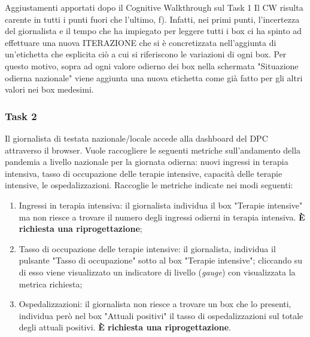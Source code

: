\begin{bclogo}{Aggiustamenti apportati dopo il Cognitive Walkthrough sul Task 1}
    Il CW risulta carente in tutti i punti fuori che l'ultimo, f).
    Infatti, nei primi punti, l'incertezza del giornalista e il tempo che ha impiegato per leggere tutti i box ci ha spinto ad effettuare una nuova ITERAZIONE che si è concretizzata nell'aggiunta di un'etichetta che esplicita ciò a cui si riferiscono le variazioni di ogni box.
    Per questo motivo, sopra ad ogni valore odierno dei box nella schermata "Situazione  odierna nazionale" viene aggiunta una nuova etichetta come già fatto per gli altri valori nei box medesimi.
\end{bclogo}

\subsubsection{Task 2}
\label{sss:cw-task-2}

Il giornalista di testata nazionale/locale accede alla dashboard del DPC attraverso il browser.
Vuole raccogliere le seguenti metriche sull'andamento della pandemia a livello nazionale per la giornata odierna: nuovi ingressi in terapia intensiva, tasso di occupazione delle terapie intensive, capacità delle terapie intensive, le ospedalizzazioni.
Raccoglie le metriche indicate nei modi seguenti:
\begin{enumerate}[label=\alph*.]
    \item Ingressi in terapia intensiva: il giornalista individua il box "Terapie intensive" ma non riesce a trovare il numero degli ingressi odierni in terapia intensiva. \textbf{È richiesta una riprogettazione};
    \item Tasso di occupazione delle terapie intensive: il giornalista, individua il pulsante "Tasso di occupazione" sotto al box "Terapie intensive"; cliccando su di esso viene visualizzato un indicatore di livello (\textit{gauge}) con visualizzata la metrica richiesta;
    \item Ospedalizzazioni: il giornalista non riesce a trovare un box che lo presenti, individua però nel box "Attuali positivi" il tasso di ospedalizzazioni sul totale degli attuali positivi. \textbf{È richiesta una riprogettazione}.
\end{enumerate}


